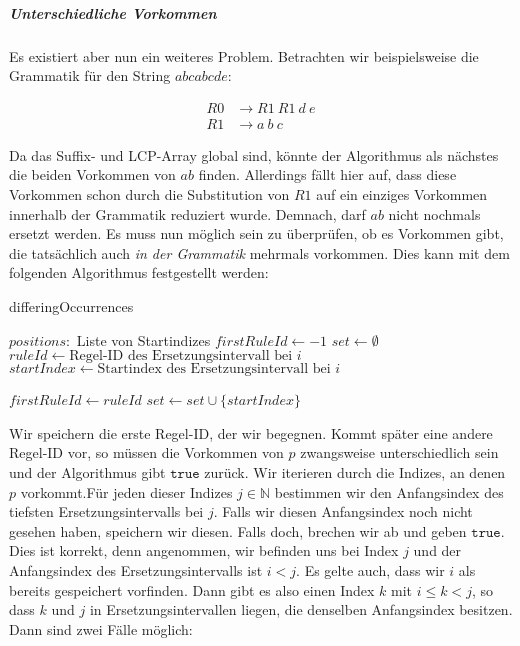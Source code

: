 \subparagraph{Unterschiedliche Vorkommen}

Es existiert aber nun ein weiteres Problem. Betrachten wir beispielsweise die Grammatik für den String $abcabcde$:

\begin{align*}
	R0 &\rightarrow R1\ R1\ d\ e\\
	R1 &\rightarrow a\ b\ c
\end{align*}

Da das Suffix- und LCP-Array global sind, könnte der Algorithmus als nächstes die beiden Vorkommen von $ab$ finden. 
Allerdings fällt hier auf, dass diese Vorkommen schon durch die Substitution von $R1$ auf ein einziges Vorkommen innerhalb der Grammatik reduziert wurde. Demnach, darf $ab$ nicht nochmals ersetzt werden. 
Es muss nun möglich sein zu überprüfen, ob es Vorkommen gibt, die tatsächlich auch \textit{in der Grammatik} mehrmals vorkommen.
Dies kann mit dem folgenden Algorithmus festgestellt werden:

\begin{algorithm}
	\caption{differingOccurrences}
	\begin{algorithmic}
		\REQUIRE $positions:$ Liste von Startindizes
		\STATE $firstRuleId \leftarrow -1$
		\STATE $set \leftarrow \emptyset$
			\STATE $ruleId \leftarrow \text{Regel-ID des Ersetzungsintervall bei } i$
			\STATE $startIndex \leftarrow \text{Startindex des Ersetzungsintervall bei } i$
			
				\STATE $firstRuleId \leftarrow ruleId$
				\RETURN \TRUE
			\ENDIF
			\STATE $set \leftarrow set \cup \{startIndex\}$
		\ENDFOR
		\RETURN \FALSE
	\end{algorithmic}
\end{algorithm}

Wir speichern die erste Regel-ID, der wir begegnen. Kommt später eine andere Regel-ID vor, so müssen die Vorkommen von $p$ zwangsweise unterschiedlich sein und der Algorithmus gibt $\texttt{true}$ zurück.
Wir iterieren durch die Indizes, an denen $p$ vorkommt.Für jeden dieser Indizes $j \in \mathbb{N}$ bestimmen wir den Anfangsindex des tiefsten Ersetzungsintervalls bei $j$. 
Falls wir diesen Anfangsindex noch nicht gesehen haben, speichern wir diesen. Falls doch, brechen wir ab und geben $\texttt{true}$. 
Dies ist korrekt, denn angenommen, wir befinden uns bei Index $j$ und der Anfangsindex des Ersetzungsintervalls ist $i < j$. Es gelte auch, dass wir $i$ als bereits gespeichert vorfinden. Dann gibt es also einen Index $k$ mit $i \leq k < j$, so dass $k$ und $j$ in Ersetzungsintervallen liegen, die denselben Anfangsindex besitzen. Dann sind zwei Fälle möglich:

